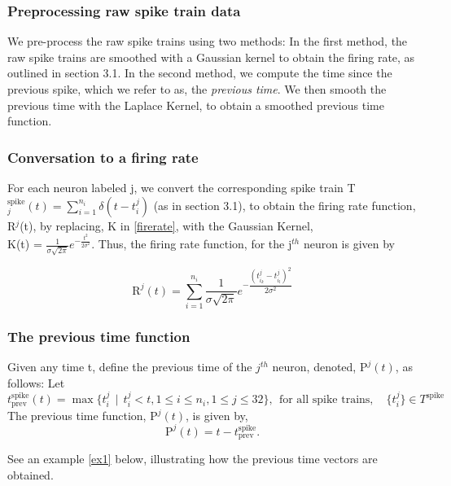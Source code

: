 \subsubsection{Preprocessing raw spike train data}
We pre-process the raw spike trains using two methods:
In the first method, the raw spike trains are smoothed with a Gaussian kernel to obtain the firing rate, as outlined in section 3.1. In the second method, we compute the time since the previous spike, which we refer to as, the \textit{previous time}. We then smooth the previous time with the Laplace Kernel,
to obtain a smoothed previous time function.\\


\subsubsection{Conversation to a firing rate}
For each neuron labeled j,  we convert the corresponding spike train
T$^{\text{spike}}_{j}(t) = \displaystyle \sum_{i=1}^{n_{i}} \delta(t-t_{i}^{j})$ (as in section 3.1), to obtain the firing rate function,
 R$^{j}$(t), by replacing, K in \eqref{firerate}, with the  Gaussian Kernel,\\
 K(t) =  $\displaystyle \frac{1}{\sigma \sqrt{2\pi}} e^{-\frac{t^2}{2\sigma^2}} $.
Thus, the firing rate function, for the j$^{th}$ neuron is given by

\begin{equation} \label{jfirerate}
\text{R}^{j}(t) = \sum_{i=1}^{n_{i}}  \frac{1}{\sigma \sqrt{2\pi}} 
e^{-\dfrac{(t_{i_{k}}^{j}  - t_{i_{l}}^{j})^2}{2\sigma^2}} 
\end{equation}

\subsubsection{The previous time function}
Given any time t, define the previous time of the $j^{th}$ neuron, denoted, $\text{P}^{j}(t)$, as follows: Let 
\[
t^{\text{spike}}_{\text{prev}}(t) = \displaystyle \max  \{  t^{j}_{i} \ \ | \ \ t^{j}_{i} < t, 1 \leq i \leq n_{i}, 1 \leq j \leq 32 \},\ \ \text{for all spike trains}, \quad  \{t^{j}_{i}\} \in T^{\text{spike}}
\]
The previous time function, P$^{j}(t)$, is given by, 
\begin{equation}\label{prevtimefun}
\text{P}^{j}(t) = t - t^{\text{spike}}_{\text{prev}}.
\end{equation}


See an example \eqref{ex1} below, illustrating how the previous time vectors are obtained.\\


